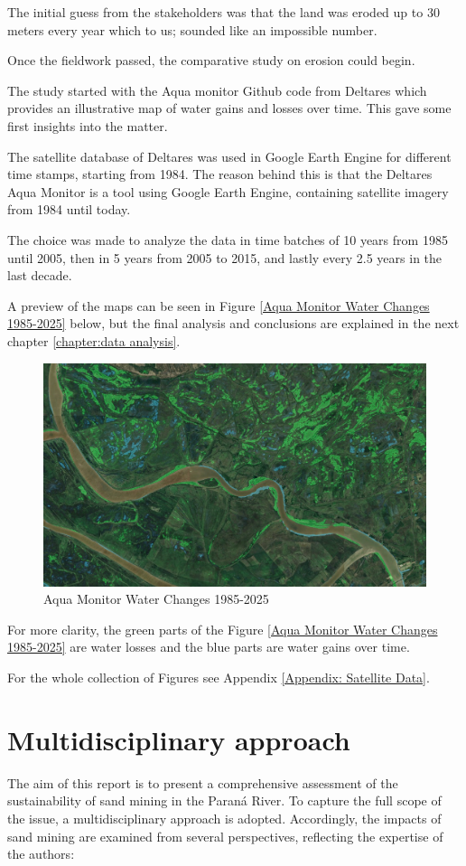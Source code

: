 The initial guess from the stakeholders was that the land was eroded up to 30 meters every year which to us; sounded like an impossible number.

Once the fieldwork passed, the comparative study on erosion could begin.

The study started with the Aqua monitor Github code from Deltares which provides an illustrative map of water gains and losses over time. This gave some first insights into the matter.

The satellite database of Deltares was used in Google Earth Engine for different time stamps, starting from 1984. The reason behind this is that the Deltares Aqua Monitor is a tool using Google Earth Engine, containing satellite imagery from 1984 until today. 
 
The choice was made to analyze the data in time batches of 10 years from 1985 until 2005, then in 5 years from 2005 to 2015, and lastly every 2.5 years in the last decade.

A preview of the maps can be seen in Figure \ref{Aqua Monitor Water Changes 1985-2025} below, but the final analysis and conclusions are explained in the next chapter \ref{chapter:data analysis}. 

\begin{figure}[H]
    \centering
    \includegraphics[width=0.75\linewidth]{figures/ch4/1985-2025.jpg}
    \caption{Aqua Monitor Water Changes 1985-2025}
    \label{fig:measurements day2}
\end{figure}
\label{Aqua Monitor Water Changes 1985-2025}

For more clarity, the green parts of the Figure \ref{Aqua Monitor Water Changes 1985-2025} are water losses and the blue parts are water gains over time.


For the whole collection of Figures see Appendix \ref{Appendix: Satellite Data}.


\section{Multidisciplinary approach}
The aim of this report is to present a comprehensive assessment of the sustainability of sand mining in the Paraná River. To capture the full scope of the issue, a multidisciplinary approach is adopted. Accordingly, the impacts of sand mining are examined from several perspectives, reflecting the expertise of the authors:

